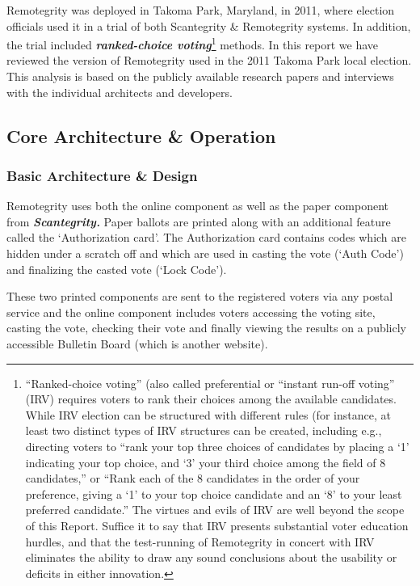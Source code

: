 Remotegrity was deployed in Takoma Park, Maryland, in 2011, where
election officials used it in a trial of both Scantegrity \&
Remotegrity systems. In addition, the trial included
\textbf{\textit{ranked-choice voting}}\footnote{``Ranked-choice
  voting'' (also called preferential or ``instant run-off voting''
  (IRV) requires voters to rank their choices among the available
  candidates. While IRV election can be structured with different
  rules (for instance, at least two distinct types of IRV structures
  can be created, including e.g., directing voters to ``rank your top
  three choices of candidates by placing a `1' indicating your top
  choice, and `3' your third choice among the field of 8 candidates,''
  or ``Rank each of the 8 candidates in the order of your preference,
  giving a `1' to your top choice candidate and an `8' to your least
  preferred candidate.'' The virtues and evils of IRV are well beyond
  the scope of this Report. Suffice it to say that IRV presents
  substantial voter education hurdles, and that the test-running of
  Remotegrity in concert with IRV eliminates the ability to draw any
  sound conclusions about the usability or deficits in either
  innovation.} methods. In this report we have reviewed the version of
Remotegrity used in the 2011 Takoma Park local election. This analysis
is based on the publicly available research papers and interviews with
the individual architects and developers.

\subsection{Core Architecture \& Operation}

\subsubsection{Basic Architecture \& Design}

Remotegrity uses both the online component as well as the paper
component from \textbf{\textit{Scantegrity. }}Paper ballots are
printed along with an additional feature called the `Authorization
card'. The Authorization card contains codes which are hidden under a
scratch off and which are used in casting the vote (`Auth Code') and
finalizing the casted vote (`Lock Code').

These two printed components are sent to the registered voters via any
postal service and the online component includes voters accessing the
voting site, casting the vote, checking their vote and finally viewing
the results on a publicly accessible Bulletin Board (which is another
website).

